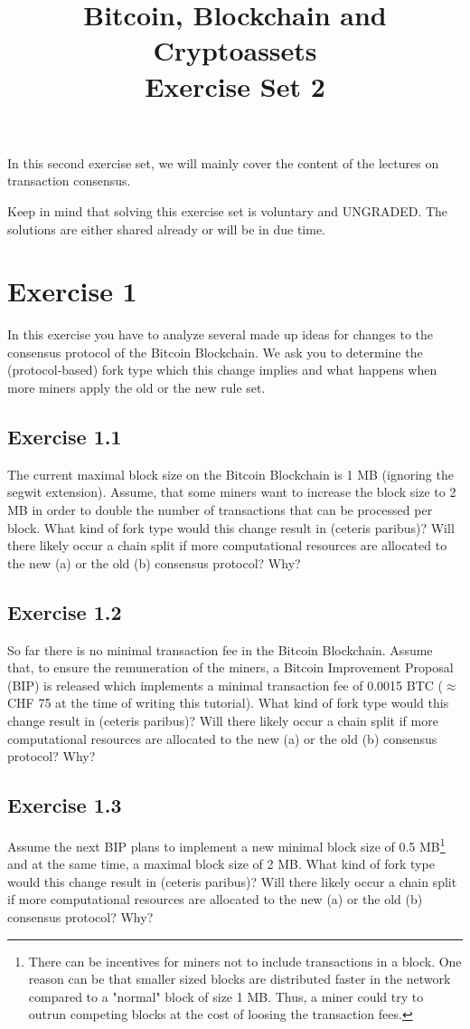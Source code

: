 \documentclass[12pt]{article}
\title{Bitcoin, Blockchain and Cryptoassets \\ Exercise Set 2}
\author{}
\date{ }
\begin{document}
	\maketitle
	
	In this second exercise set, we will mainly cover the content of the lectures on transaction consensus. \par
	
	Keep in mind that solving this exercise set is voluntary and UNGRADED. The solutions are either shared already or will be in due time.
	
	\newpage
	
	\section*{Exercise 1}
	In this exercise you have to analyze several made up ideas for changes to the consensus protocol of the Bitcoin Blockchain. We ask you to determine the (protocol-based) fork type which this change implies and what happens when more miners apply the old or the new rule set.
	\subsection*{Exercise 1.1}
	The current maximal block size on the Bitcoin Blockchain is 1 MB (ignoring the segwit extension). Assume, that some miners want to increase the block size to 2 MB in order to double the number of transactions that can be processed per block. What kind of fork type would this change result in (ceteris paribus)? Will there likely occur a chain split if more computational resources are allocated to the new (a) or the old (b) consensus protocol? Why?
	
	\subsection*{Exercise 1.2}
	So far there is no minimal transaction fee in the Bitcoin Blockchain. Assume that, to ensure the remuneration of the miners, a Bitcoin Improvement Proposal (BIP) is released which implements a minimal transaction fee of 0.0015 BTC ($\approx$ CHF 75 at the time of writing this tutorial). What kind of fork type would this change result in (ceteris paribus)? Will there likely occur a chain split if more computational resources are allocated to the new (a) or the old (b) consensus protocol? Why?
	
	\subsection*{Exercise 1.3}
	Assume the next BIP plans to implement a new minimal block size of 0.5 MB\footnote{There can be incentives for miners not to include transactions in a block. One reason can be that smaller sized blocks are distributed faster in the network compared to a "normal" block of size 1 MB. Thus, a miner could try to outrun competing blocks at the cost of loosing the transaction fees.} and at the same time, a maximal block size of 2 MB. What kind of fork type would this change result in (ceteris paribus)? Will there likely occur a chain split if more computational resources are allocated to the new (a) or the old (b) consensus protocol? Why?
	
\end{document}
